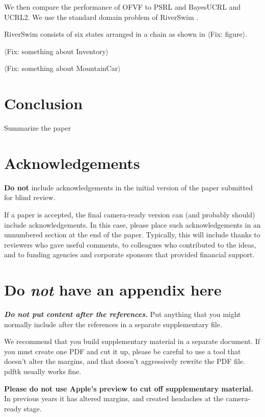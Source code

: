 \documentclass{article}
\newcommand{\fix}[1]{{$\langle${\color{red}\sc Fix: #1}$\rangle$}}
\begin{document}
We then compare the performance of OFVF to PSRL and BayesUCRL and
UCRL2. We use the standard domain problem of
RiverSwim \cite{strehl2008analysis}.

RiverSwim consists of six states arranged in a chain as shown in
\fix{figure}.

\fix{something about Inventory}

\fix{something about MountainCar}

\section{Conclusion}

Summarize the paper

\section*{Acknowledgements}

\textbf{Do not} include acknowledgements in the initial version of
the paper submitted for blind review.

If a paper is accepted, the final camera-ready version can (and
probably should) include acknowledgements. In this case, please
place such acknowledgements in an unnumbered section at the
end of the paper. Typically, this will include thanks to reviewers
who gave useful comments, to colleagues who contributed to the ideas,
and to funding agencies and corporate sponsors that provided financial
support.

\nocite{langley00}





\appendix
\section{Do \emph{not} have an appendix here}

\textbf{\emph{Do not put content after the references.}}
%
Put anything that you might normally include after the references in a separate
supplementary file.

We recommend that you build supplementary material in a separate document.
If you must create one PDF and cut it up, please be careful to use a tool that
doesn't alter the margins, and that doesn't aggressively rewrite the PDF file.
pdftk usually works fine. 

\textbf{Please do not use Apple's preview to cut off supplementary material.} In
previous years it has altered margins, and created headaches at the camera-ready
stage. 
\end{document}
